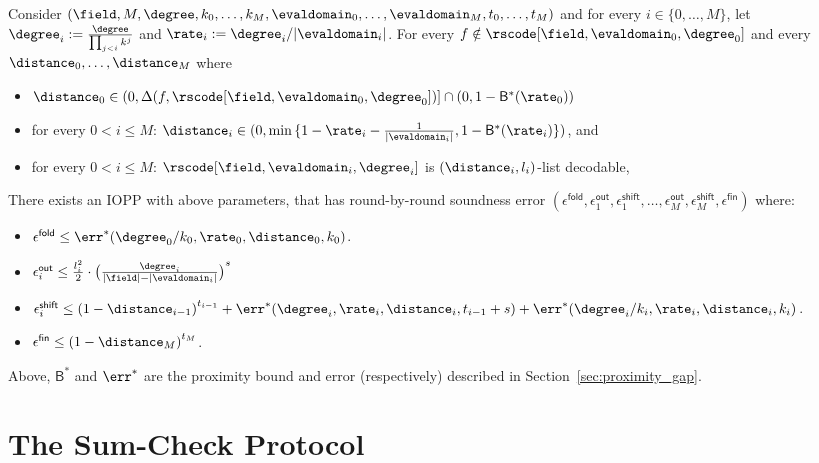 \begin{lemma}\label{lemma:rnd_by_rnd_soundness}
    Consider $(\field,M,\degree,k_0,\ldots,k_M,\evaldomain_0,\ldots,\evaldomain_M,t_0,\ldots,t_M)$ and for every $i\in\{0,\ldots,M\}$, let $\degree_i:=\frac{\degree}{\prod_{j<i}k^j}$ and $\rate_i:=\degree_i/|\evaldomain_i|$. For every $f\notin\rscode[\field,\evaldomain_0,\degree_0]$ and every $\distance_0,\ldots,\distance_M$ where
    \begin{itemize}
        \item $\distance_0\in(0,\Delta(f,\rscode[\field,\evaldomain_0,\degree_0])]\cap(0,1-{\mathsf{B}}^*(\rate_0))$
        \item for every $0<i\leq M$: $\distance_i\in(0,\min{\{1-\rate_i-\frac{1}{|\evaldomain_i|},1-{\mathsf{B}^*(\rate_i)}\}})$, and
        \item for every $0<i\leq M$: $\rscode[\field,\evaldomain_i,\degree_i]$ is $(\distance_i,l_i)$-list decodable,
    \end{itemize}
    There exists an IOPP with above parameters, that has round-by-round soundness error $(\epsilon^{\mathsf{fold}},\epsilon^{\mathsf{out}}_1,\epsilon^{\mathsf{shift}}_1,\ldots,\epsilon^{\mathsf{out}}_M,\epsilon^{\mathsf{shift}}_M,\epsilon^{\mathsf{fin}})$ where:
    \begin{itemize}
        \item $\epsilon^{\mathsf{fold}}\leq\err^*(\degree_0/k_0,\rate_0,\distance_0,k_0)$.
        \item $\epsilon^{\mathsf{out}}_i\leq\frac{l^2_i}{2}\cdot{\big(\frac{\degree_i}{|\field|-|\evaldomain_i|}\big)}^s$
        \item $\epsilon^{\mathsf{shift}}_i\leq {(1-\distance_{i-1})}^{t_{i-1}}+\err^*(\degree_i,\rate_i,\distance_i,t_{i-1}+s)+\err^*(\degree_i/k_i,\rate_i,\distance_i,k_i)$.
        \item $\epsilon^{\mathsf{fin}}\leq{(1-\distance_M)}^{t_M}$.
    \end{itemize}
    Above, ${\mathsf{B}}^*$ and ${\err}^*$ are the proximity bound and error (respectively) described in Section~\ref{sec:proximity_gap}.
\end{lemma}


\section{The Sum-Check Protocol}\label{sec:sumcheck}

